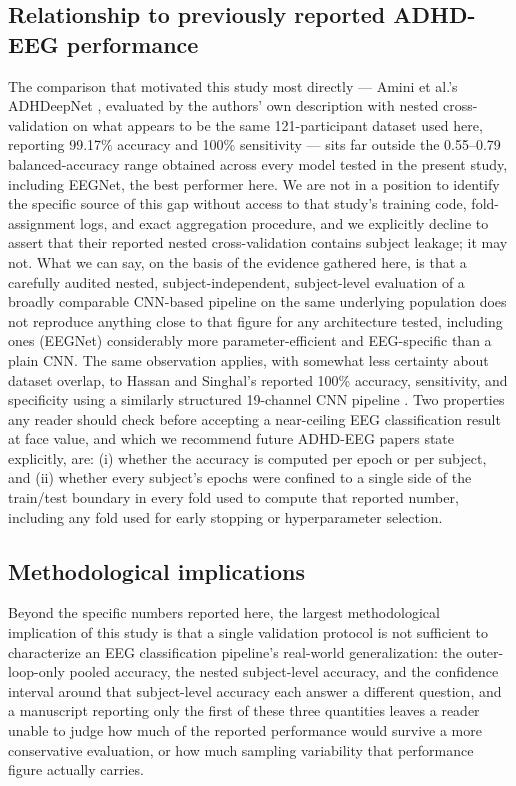 \documentclass[a4paper,fleqn]{cas-sc}
\begin{document}
\subsection{Relationship to previously reported ADHD-EEG performance}

The comparison that motivated this study most directly --- Amini et al.'s ADHDeepNet \cite{amini2025adhdeepnet}, evaluated by the authors' own description with nested cross-validation on what appears to be the same 121-participant dataset used here, reporting 99.17\% accuracy and 100\% sensitivity --- sits far outside the 0.55--0.79 balanced-accuracy range obtained across every model tested in the present study, including EEGNet, the best performer here. We are not in a position to identify the specific source of this gap without access to that study's training code, fold-assignment logs, and exact aggregation procedure, and we explicitly decline to assert that their reported nested cross-validation contains subject leakage; it may not. What we can say, on the basis of the evidence gathered here, is that a carefully audited nested, subject-independent, subject-level evaluation of a broadly comparable CNN-based pipeline on the same underlying population does not reproduce anything close to that figure for any architecture tested, including ones (EEGNet) considerably more parameter-efficient and EEG-specific than a plain CNN. The same observation applies, with somewhat less certainty about dataset overlap, to Hassan and Singhal's reported 100\% accuracy, sensitivity, and specificity using a similarly structured 19-channel CNN pipeline \cite{hassan2024convolutional}. Two properties any reader should check before accepting a near-ceiling EEG classification result at face value, and which we recommend future ADHD-EEG papers state explicitly, are: (i) whether the accuracy is computed per epoch or per subject, and (ii) whether every subject's epochs were confined to a single side of the train/test boundary in every fold used to compute that reported number, including any fold used for early stopping or hyperparameter selection.



\subsection{Methodological implications}

Beyond the specific numbers reported here, the largest methodological implication of this study is that a single validation protocol is not sufficient to characterize an EEG classification pipeline's real-world generalization: the outer-loop-only pooled accuracy, the nested subject-level accuracy, and the confidence interval around that subject-level accuracy each answer a different question, and a manuscript reporting only the first of these three quantities leaves a reader unable to judge how much of the reported performance would survive a more conservative evaluation, or how much sampling variability that performance figure actually carries.
\end{document}

